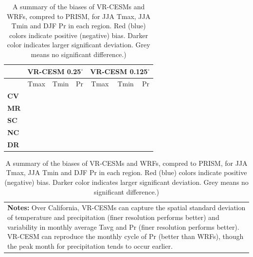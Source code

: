 \documentclass[draft,ms]{agutex}   %
\begin{document}
\begin{table}
\begin{center}
\caption{A summary of the biases of VR-CESMs and WRFs, compred to PRISM, for JJA Tmax, JJA Tmin and DJF Pr in each region. Red (blue) colors indicate positive (negative) bias. Darker color indicates larger significant deviation. Grey means no significant difference.)} \label{tab:summary}

\begin{tabular*}{5.5in}{l @{\extracolsep{\fill}}cccccc}
\hline \textbf{} & \multicolumn{3}{c}{\textbf{VR-CESM 0.25$^\circ$}} & \multicolumn{3}{c}{\textbf{VR-CESM 0.125$^\circ$}} \\
\hline & Tmax & Tmin & Pr & Tmax & Tmin & Pr  \\
\hline \textbf{CV} & \cellcolor{red!60}{2$-$3$^\circ$C} & \cellcolor{red!60}{2$-$3$^\circ$C} & \cellcolor{red!60}{70$-$100$\%$} & \cellcolor{red!60}{2$-$3$^\circ$C}  & \cellcolor{red!60}{2$-$3$^\circ$C} & \cellcolor{red!30}{30$-$60$\%$} \\

\hline \textbf{MR} &  \cellcolor{red!60}{2$-$3$^\circ$C} & \cellcolor{red!60}{2$-$4$^\circ$C} & \cellcolor{black!20} & \cellcolor{red!60}{2$^\circ$C}  & \cellcolor{red!60}{2$-$3$^\circ$C} & \cellcolor{black!20}  \\

\hline \textbf{SC} &   \cellcolor{blue!60}{2$^\circ$C} & \cellcolor{red!60}{2$-$3$^\circ$C}  & \cellcolor{black!20}  &  \cellcolor{blue!60}{2$^\circ$C} & \cellcolor{red!60}{2$-$3$^\circ$C}  & \cellcolor{black!20} \\

\hline \textbf{NC} & \cellcolor{blue!60}{2$-$3$^\circ$C} & \cellcolor{black!20} & \cellcolor{black!20} & \cellcolor{blue!60}{2$-$3$^\circ$C} & \cellcolor{black!20} & \cellcolor{black!20} \\

\hline \textbf{DR} & \cellcolor{black!20} & \cellcolor{red!60}{2$-$4$^\circ$C}  &  \cellcolor{red!60}{60$\%$} & \cellcolor{black!20} & \cellcolor{red!60}{2$-$4$^\circ$C}  &  \cellcolor{red!30}{30$\%$} \\

\hline
\end{tabular*}

\begin{tabular}{p{6in}}
\small\textbf{Notes:} Over California, VR-CESMs can capture the spatial standard deviation of temperature and precipitation (finer resolution performs better) and variability in monthly average Tavg and Pr (finer resolution performs better). VR-CESM can reproduce the monthly cycle of Pr (better than WRFs), though the peak month for precipitation tends to occur earlier.
\end{tabular}


\end{center}
\end{table}
\end{document}
